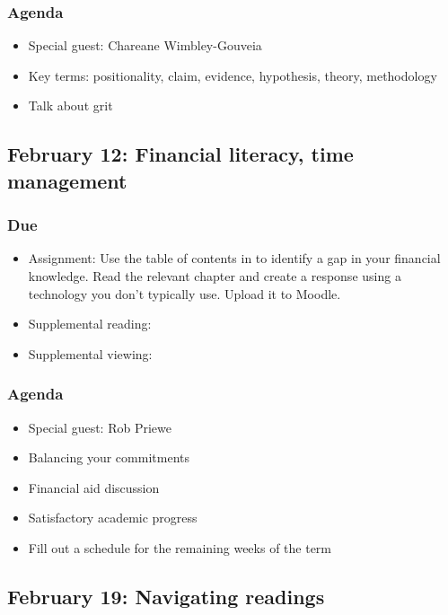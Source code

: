 \documentclass[12pt,article,oneside]{memoir}
\begin{document}
\subsubsection{Agenda}
\begin{itemize}
\item Special guest: Chareane Wimbley-Gouveia
\item Key terms: positionality, claim, evidence, hypothesis, theory, methodology
\item Talk about grit
\end{itemize}




\subsection{February 12: Financial literacy, time management}
\subsubsection{Due}
\begin{itemize}
 \item Assignment: Use the table of contents in \cite{everyday} to identify a gap in your financial knowledge.  Read the relevant chapter and create a response using a technology you don't typically use.  Upload it to Moodle.
 \item Supplemental reading: \cite{finra, smart}
 \item Supplemental viewing: \cite{credits}
\end{itemize}

\subsubsection{Agenda}
\begin{itemize}
\item Special guest: Rob Priewe
\item Balancing your commitments
\item Financial aid discussion
\item Satisfactory academic progress
\item Fill out a schedule for the remaining weeks of the term
\end{itemize}



\subsection{February 19: Navigating readings}
\end{document}
